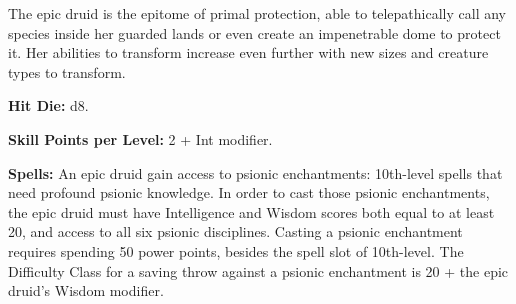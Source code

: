 The epic druid is the epitome of primal protection, able to telepathically call any species inside her guarded lands or even create an impenetrable dome to protect it. Her abilities to transform increase even further with new sizes and creature types to transform.


\textbf{Hit Die:} d8.

\textbf{Skill Points per Level:} 2 + Int modifier.

\textbf{Spells:} An epic druid gain access to psionic enchantments: 10th-level spells that need profound psionic knowledge. In order to cast those psionic enchantments, the epic druid must have Intelligence and Wisdom scores both equal to at least 20, and access to all six psionic disciplines. Casting a psionic enchantment requires spending 50 power points, besides the spell slot of 10th-level. The Difficulty Class for a saving throw against a psionic enchantment is 20 + the epic druid's Wisdom modifier.

